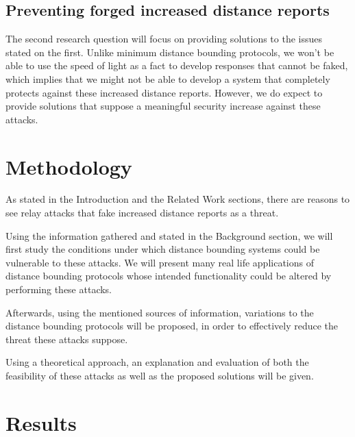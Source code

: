 \documentclass{article}
\begin{document}
\subsection{Preventing forged increased distance reports}

The second research question will focus on providing solutions to the issues stated on the first. Unlike minimum distance bounding protocols, we won't be able to use the speed of light as a fact to develop responses that cannot be faked, which implies that we might not be able to develop a system that completely protects against these increased distance reports. However, we do expect to provide solutions that suppose a meaningful security increase against these attacks.









\section{Methodology}
\label{sec:methodology}

As stated in the Introduction and the Related Work sections, there are reasons to see relay attacks that fake increased distance reports as a threat.

Using the information gathered and stated in the Background section, we will first study the conditions under which distance bounding systems could be vulnerable to these attacks. We will present many real life applications of distance bounding protocols whose intended functionality could be altered by performing these attacks.

Afterwards, using the mentioned sources of information, variations to the distance bounding protocols will be proposed, in order to effectively reduce the threat these attacks suppose.

Using a theoretical approach, an explanation and evaluation of both the feasibility of these attacks as well as the proposed solutions will be given.











\section{Results}
\label{sec:results}
\end{document}
